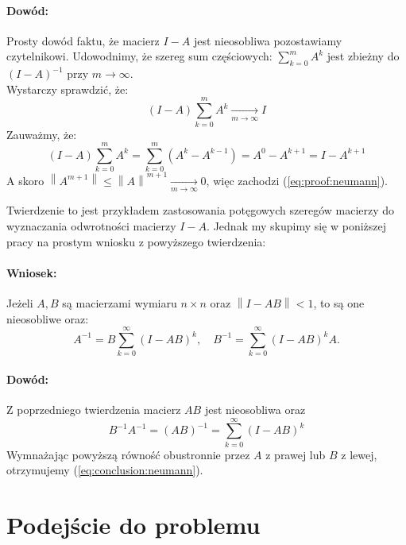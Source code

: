\documentclass{article}
\newcommand{\norm}[1]{\left\lVert#1\right\rVert}
\begin{document}
\paragraph{Dowód:} Prosty dowód faktu, że macierz $I - A$ jest nieosobliwa pozostawiamy czytelnikowi. Udowodnimy, że szereg sum częściowych: $\sum_{k=0}^{m}A^k$ jest zbieżny do $(I - A)^{-1}$ przy $m \rightarrow \infty$. \\

Wystarczy sprawdzić, że:
\begin{equation}
\label{eq:proof:neumann}
(I - A)\sum_{k=0}^{m}A^k \xrightarrow[m \rightarrow \infty]{} I
\end{equation}
Zauważmy, że:
\begin{equation}
(I - A)\sum_{k=0}^{m}A^k = \sum_{k=0}^{m}(A^k - A^{k-1}) = A^0 - A^{k+1} = I - A^{k+1}
\end{equation}
A skoro $\norm{A^{m+1}} \le \norm{A}^{m+1} \xrightarrow[m \rightarrow \infty]{} 0$, więc zachodzi (\ref{eq:proof:neumann}).

Twierdzenie to jest przykładem zastosowania potęgowych szeregów macierzy do wyznaczania odwrotności macierzy $I - A$. Jednak my skupimy się w poniższej pracy na prostym wniosku z powyższego twierdzenia:

\paragraph{Wniosek:} Jeżeli $A, B$ są macierzami wymiaru $n \times n$ oraz $\norm{I -AB} < 1$, to są one nieosobliwe oraz:
\begin{equation}
\label{eq:conclusion:neumann}
A^{-1} = B\sum_{k=0}^{\infty}(I - AB)^k, \quad B^{-1}=\sum_{k=0}^{\infty} (I - AB)^k A.
\end{equation}

\paragraph{Dowód:} Z poprzedniego twierdzenia macierz $AB$ jest nieosobliwa oraz 
\begin{equation}
B^{-1}A^{-1} = (AB)^{-1} = \sum_{k=0}^{\infty}(I - AB)^k
\end{equation}
Wymnażając powyższą równość obustronnie przez $A$ z prawej lub $B$ z lewej, otrzymujemy (\ref{eq:conclusion:neumann}). \\

\section{Podejście do problemu}
\end{document}
